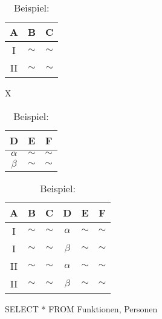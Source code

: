 \documentclass{article}
\begin{document}
\begin{table}[!htbp]
  \center
  \begin{tabular}{c|c|c}
    A           & B      & C      \\
    \hline
    \textrm{I}  & $\sim$ & $\sim$ \\
    \textrm{II} & $\sim$ & $\sim$ \\
  \end{tabular}
  \quad
  X
  \quad
  \begin{tabular}{c|c|c}
    D        & E      & F      \\
    \hline
    $\alpha$ & $\sim$ & $\sim$ \\
    $\beta$  & $\sim$ & $\sim$ \\
  \end{tabular}

  \vspace{1.2em}
  \begin{tabular}{c|c|c|c|c|c}
    A           & B      & C      & D        & E      & F      \\
    \hline
    \textrm{I}  & $\sim$ & $\sim$ & $\alpha$ & $\sim$ & $\sim$ \\
    \textrm{I}  & $\sim$ & $\sim$ & $\beta$  & $\sim$ & $\sim$ \\
    \textrm{II} & $\sim$ & $\sim$ & $\alpha$ & $\sim$ & $\sim$ \\
    \textrm{II} & $\sim$ & $\sim$ & $\beta$  & $\sim$ & $\sim$ \\
  \end{tabular}
  \quad
  SELECT * FROM Funktionen, Personen
  \label{tab:join:1}
  \caption{Beispiel: \protect{}}
\end{table}
\end{document}

